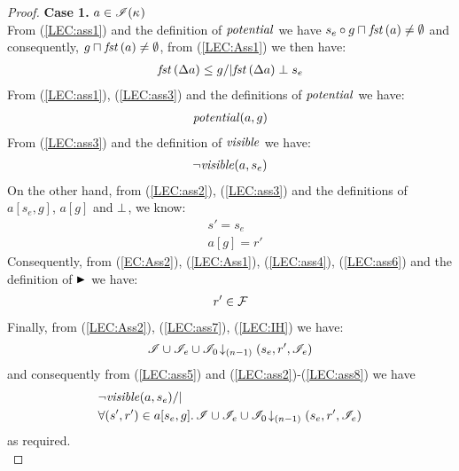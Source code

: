 \begin{lemma}
\begin{proof}
\noindent\textbf{Case 1. } $a \in \mathscr{I}(\kappa_{})$\\ 
From (\ref{LEC:ass1}) and the definition of $\mathit{potential}$ we have $s_e \circ g \sqcap_{} \mathit{fst}\left(a\right) \not= \emptyset$ and consequently, $g \sqcap_{} \mathit{fst}\left(a\right) \not= \emptyset$, from (\ref{LEC:Ass1}) we then have:
%
\begin{align}
	\mathit{fst}\left(\Delta {a}\right) \leq g /| \mathit{fst}\left(\Delta {a}\right) \mathrel{\bot} s_e \label{LEC:ass3}
\end{align}
% 
From (\ref{LEC:ass1}), (\ref{LEC:ass3}) and the definitions of $\mathit{potential}$ we have:
%
\begin{align}
	\mathit{potential}(a, g) \label{LEC:ass4}
\end{align}
%
From (\ref{LEC:ass3}) and the definition of $\mathit{visible}$ we have:
%
\begin{align}
	\neg\mathit{visible}(a, s_e) 
	\label{LEC:ass5}
\end{align}
%
On the other hand, from (\ref{LEC:ass2}), (\ref{LEC:ass3}) and the definitions of $a[s_e, g]$, $a[g]$ and $\mathrel{\bot}$, we know: 
%
\begin{align}
	& s' = s_e  \label{LEC:ass5}\\
	& a[g] = r'  \label{LEC:ass6}
\end{align}
%
Consequently, from (\ref{EC:Ass2}), (\ref{LEC:Ass1}), (\ref{LEC:ass4}),  (\ref{LEC:ass6}) and the definition of $\strictfences$ we have:
%
\begin{align}
	r' \in \mathcal{F}_{}  \label{LEC:ass7}
\end{align}
%
Finally, from (\ref{LEC:Ass2}), (\ref{LEC:ass7}), (\ref{LEC:IH}) we have:
%
\begin{align}
	\mathscr{I} \cup \mathscr{I}_{e} \cup \mathscr{I}_0 \!\downarrow_{(n-1)} \left(s_e, r', \mathscr{I}_e\right)
	\label{LEC:ass8}
\end{align}
%
and consequently from (\ref{LEC:ass5}) and (\ref{LEC:ass2})-(\ref{LEC:ass8}) we have
%
\begin{align*}
	& \neg\mathit{visible}(a, s_e) /| \\
	& \forall (s', r') \in a[s_e, g].\, \mathscr{I} \cup \mathscr{I}_{e} \cup \mathscr{I}_0 \!\downarrow_{(n-1)} \left(s_e, r', \mathscr{I}_e\right)
\end{align*}
%
as required.\\
%
%
%
%


\end{proof}
\end{lemma}
